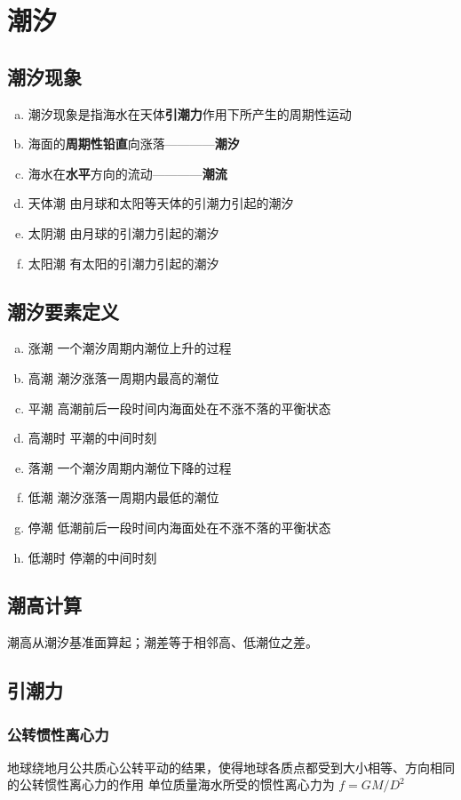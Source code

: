 \section{潮汐}
			\subsection{潮汐现象}
			\begin{enumerate}[a)]
				\item 潮汐现象是指海水在天体\textbf{引潮力}作用下所产生的周期性运动
				\item 海面的\textbf{周期性}\textbf{铅直}向涨落————\textbf{潮汐}
				\item 海水在\textbf{水平}方向的流动————\textbf{潮流}
				\item 天体潮 由月球和太阳等天体的引潮力引起的潮汐
				\item 太阴潮 由月球的引潮力引起的潮汐
				\item 太阳潮 有太阳的引潮力引起的潮汐 
			\end{enumerate}
			
			\subsection{潮汐要素定义}
			\begin{enumerate}[a)]
				\item 涨潮 一个潮汐周期内潮位上升的过程
				\item 高潮 潮汐涨落一周期内最高的潮位
				\item 平潮 高潮前后一段时间内海面处在不涨不落的平衡状态
				\item 高潮时 平潮的中间时刻
				\item 落潮 一个潮汐周期内潮位下降的过程
				\item 低潮 潮汐涨落一周期内最低的潮位
				\item 停潮 低潮前后一段时间内海面处在不涨不落的平衡状态
				\item 低潮时 停潮的中间时刻
			\end{enumerate}
			\subsection{潮高计算}
			潮高从潮汐基准面算起；潮差等于相邻高、低潮位之差。
			
			\subsection{引潮力}
			\subsubsection{公转惯性离心力}
			地球绕地月公共质心公转平动的结果，使得地球各质点都受到大小相等、方向相同的公转惯性离心力的作用
			单位质量海水所受的惯性离心力为 $f = GM/D^2$
